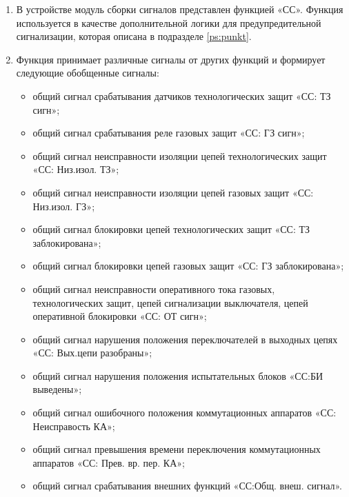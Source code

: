 
\color{black}

\begin{enumerate}
\item
В устройстве модуль сборки сигналов представлен функцией «СС». Функция используется в качестве дополнительной логики для предупредительной сигнализации, которая описана в подразделе \ref{ps:punkt}.

\item
Функция принимает различные сигналы от других функций и формирует следующие обобщенные сигналы:
\begin{itemize}
	\item общий сигнал срабатывания датчиков технологических защит «СС: ТЗ сигн»;
	\item общий сигнал срабатывания реле газовых защит «СС: ГЗ сигн»;
	\item общий сигнал неисправности изоляции цепей технологических защит «СС: Низ.изол. ТЗ»;
	\item общий сигнал неисправности изоляции цепей газовых защит «СС: Низ.изол. ГЗ»;		
	\item общий сигнал блокировки цепей технологических защит «СС: ТЗ заблокирована»;	
	\item общий сигнал блокировки цепей газовых защит «СС: ГЗ заблокирована»;
	\item общий сигнал неисправности оперативного тока газовых, технологических защит, цепей сигнализации выключателя, цепей оперативной блокировки «СС: ОТ сигн»;	
	\item общий сигнал нарушения положения переключателей в выходных цепях «СС: Вых.цепи разобраны»;
	\item общий сигнал нарушения положения испытательных блоков «СС:БИ выведены»;
	\item общий сигнал ошибочного положения коммутационных аппаратов «СС: Неисправость КА»;
	\item общий сигнал превышения времени переключения коммутационных аппаратов «СС: Прев. вр. пер. КА»;
	\item общий сигнал срабатывания внешних функций «СС:Общ. внеш. сигнал».
\end{itemize}


\end{enumerate}
